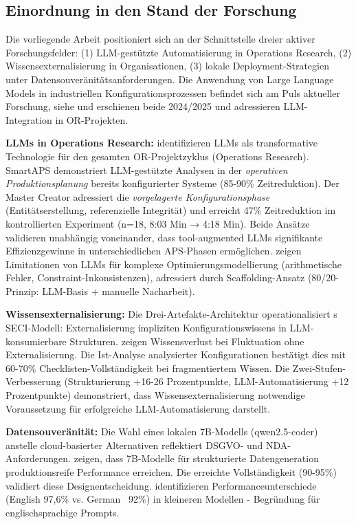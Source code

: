 \subsection{Einordnung in den Stand der Forschung}
\label{subsec:StandDerForschung}

Die vorliegende Arbeit positioniert sich an der Schnittstelle dreier aktiver Forschungsfelder: (1) LLM-gestützte Automatisierung in Operations Research, (2) Wissensexternalisierung in Organisationen, (3) lokale Deployment-Strategien unter Datensouveränitätsanforderungen. Die Anwendung von Large Language Models in industriellen Konfigurationsprozessen befindet sich am Puls aktueller Forschung, siehe \cite{fan:ai_for_or2024} und \cite{smartaps2025} erschienen beide 2024/2025 und adressieren LLM-Integration in OR-Projekten.

\noindent \textbf{LLMs in Operations Research:} \cite{fan:ai_for_or2024} identifizieren LLMs als transformative Technologie für den gesamten OR-Projektzyklus (Operations Research). SmartAPS \cite{smartaps2025} demonstriert LLM-gestützte Analysen in der \textit{operativen Produktionsplanung} bereits konfigurierter Systeme (85-90\% Zeitreduktion). Der Master Creator adressiert die \textit{vorgelagerte Konfigurationsphase} (Entitätserstellung, referenzielle Integrität) und erreicht 47\% Zeitreduktion im kontrollierten Experiment (n=18, 8:03 Min → 4:18 Min). Beide Ansätze validieren unabhängig voneinander, dass tool-augmented LLMs signifikante Effizienzgewinne in unterschiedlichen APS-Phasen ermöglichen. \cite{wasserkrug:llm_optimization2024} zeigen Limitationen von LLMs für komplexe Optimierungsmodellierung (arithmetische Fehler, Constraint-Inkonsistenzen), adressiert durch Scaffolding-Ansatz (80/20-Prinzip: LLM-Basis + manuelle Nacharbeit).

\noindent \textbf{Wissensexternalisierung:} Die Drei-Artefakte-Architektur operationalisiert \citet{nonaka:knowledge_creating_company1995}s SECI-Modell: Externalisierung impliziten Konfigurationswissens in LLM-konsumierbare Strukturen. \cite{llm:tacit_knowledge2025} zeigen Wissensverlust bei Fluktuation ohne Externalisierung. Die Ist-Analyse analysierter Konfigurationen bestätigt dies mit 60-70\% Checklisten-Vollständigkeit bei fragmentiertem Wissen. Die Zwei-Stufen-Verbesserung (Strukturierung +16-26 Prozentpunkte, LLM-Automatisierung +12 Prozentpunkte) demonstriert, dass Wissensexternalisierung notwendige Voraussetzung für erfolgreiche LLM-Automatisierung darstellt.

\noindent \textbf{Datensouveränität:} Die Wahl eines lokalen 7B-Modells (qwen2.5-coder) anstelle cloud-basierter Alternativen reflektiert DSGVO- und NDA-Anforderungen. \cite{chih:small_models2024} zeigen, dass 7B-Modelle für strukturierte Datengeneration produktionsreife Performance erreichen. Die erreichte Vollständigkeit (90-95\%) validiert diese Designentscheidung. \cite{gupta:multilingual2025} identifizieren Performanceunterschiede (English 97,6\% vs. German ~92\%) in kleineren Modellen - Begründung für englischsprachige Prompts.

